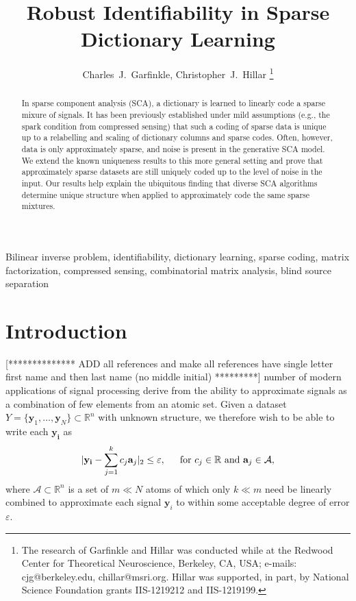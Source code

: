 \documentclass[journal, onecolumn]{IEEEtran}
\begin{document}
\title{Robust Identifiability in Sparse Dictionary Learning}

\author{Charles~J.~Garfinkle,  Christopher~J.~Hillar%
\thanks{The research of Garfinkle and Hillar was conducted while at the Redwood Center for Theoretical Neuroscience, Berkeley, CA, USA; e-mails: cjg@berkeley.edu, chillar@msri.org.  Hillar was supported, in part, by National Science Foundation grants IIS-1219212 and IIS-1219199.}}%

\maketitle

\begin{abstract}
In sparse component analysis (SCA), a dictionary is learned to linearly code a sparse mixure of signals.  It has been previously established  under mild assumptions (e.g., the spark condition from compressed sensing) that such a coding of sparse data is unique up to a relabelling and scaling of dictionary columns and sparse codes.  Often, however, data is only approximately sparse, and noise is present in the generative SCA model.  We extend the known uniqueness results to this more general setting and prove that approximately sparse datasets are still uniquely coded up to the level of noise in the input.  Our results help explain the ubiquitous finding that diverse SCA algorithms determine unique structure when applied to approximately code the same sparse mixtures.
\end{abstract}

\begin{IEEEkeywords}
Bilinear inverse problem, identifiability, dictionary learning, sparse coding, matrix factorization, compressed sensing, combinatorial matrix analysis, blind source separation
\end{IEEEkeywords}


\section{Introduction}
[************** ADD all references and make all references have single letter first name and then last name (no middle initial) *********]
 number of modern applications of signal processing derive from the ability to approximate signals as a combination of few elements from an atomic set. Given a dataset $Y = \{\mathbf{y}_1, \ldots, \mathbf{y}_N\} \subset \mathbb{R}^n$ with unknown structure, we therefore wish to be able to write each $\mathbf{y_i}$ as
\begin{align}\label{AtomicDecomposition}
|\mathbf{y_i} - \sum_{j=1}^{k} c_j \mathbf{a}_j|_2 \leq \varepsilon, \indent \text{for } c_j \in \mathbb{R} \text{ and } \mathbf{a}_j \in \mathcal{A},
\end{align}
%
where $\mathcal{A} \subset \mathbb{R}^n$ is a set of $m \ll N$ atoms of which only $k \ll m$ need be linearly combined to approximate each signal $\mathbf{y}_i$ to within some acceptable degree of error $\varepsilon$.
\end{document}
